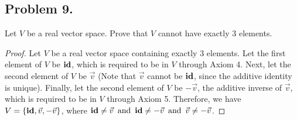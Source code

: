\documentclass{article}
\begin{document}
\newpage

\subsection*{Problem 9.}
Let $V$ be a real vector space. Prove that $V$ cannot have exactly 3 elements.

\begin{proof}
    Let $V$ be a real vector space containing exactly 3 elements. Let the first element of $V$ be $\operatorname{\textbf{id}}$, which is required to be in $V$ through Axiom 4. Next, let the second element of $V$ be $\vec{v}$ (Note that $\vec{v}$ cannot be $\operatorname{\textbf{id}}$, since the additive identity is unique). Finally, let the second element of $V$ be $-\vec{v}$, the additive inverse of $\vec{v}$, which is required to be in $V$ through Axiom 5. Therefore, we have $V = \{\operatorname{\textbf{id}}, \vec{v}, -\vec{v}\}$, where $\operatorname{\textbf{id}} \neq \vec{v} \operatorname{~\text{and}~} \operatorname{\textbf{id}} \neq -\vec{v} \operatorname{~\text{and}~} \vec{v} \neq -\vec{v}$.


\end{proof}
\end{document}
